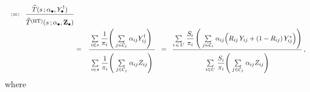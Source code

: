 \begin{itemize}
\begin{eqnarray*}
{{                }
            }
    \;\; :=: \;\;
        \dfrac{
            \widehat{T}(s\,;\abullet,Y^{\dagger}_{\bullet})
            }{
            \overset{{\color{white}.}}{
                \widehat{T}^{\textnormal{(HT)}}(s\,;\abullet,\Zdot)
                }
            }
    \\
    & = &
        \dfrac{
            {\color{white}.}
            \underset{i \in s}{\sum}\;
                \dfrac{1}{\pi_{i}}\!
                \left(\;
                    \underset{j \in \mathcal{C}_{j}}{\sum}\;
                    \alpha_{ij}Y_{ij}^{\dagger}
                    \right)
            {\color{white}.}
            }{
            \overset{{\color{white}.}}{
                \underset{i \in s}{\sum}\;
                    \dfrac{1}{\pi_{i}}\!
                    \left(\;
                        \underset{j \in \mathcal{C}_{j}}{\sum}\;
                        \alpha_{ij}Z_{ij}
                        \right)
                }
            }
    \;\; = \;\;
        \dfrac{
            \underset{i\,\in\,U}{\sum}\;
                \dfrac{S_{i}}{\pi_{i}}
                \left(\;
                    \underset{j \in \mathcal{C}_{i}}{\sum}\;\alpha_{ij}\!
                    \left(
                        R_{ij}\,Y_{ij}
                        \overset{{\color{white}.}}{+}
                        (1-R_{ij})\,Y^{*}_{ij}
                        \right)
                    \right)
            }{
            \overset{{\color{white}.}}{
                \underset{i \in U}{\sum}\;
                    \dfrac{S_{i}}{\pi_{i}}\!
                    \left(\;
                        \underset{j \in \mathcal{C}_{j}}{\sum}\;
                        \alpha_{ij}Z_{ij}
                        \right)
                }
            }\,,
    \end{eqnarray*}
    where
    \begin{itemize}

\end{itemize}
\end{itemize}
